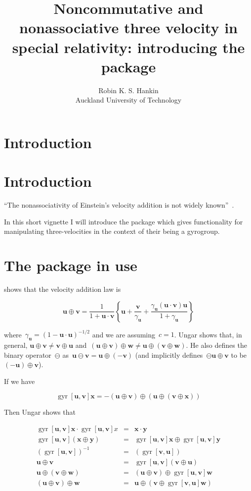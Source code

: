 \documentclass[nojss]{jss}
\author{Robin K. S. Hankin\\Auckland University of Technology}
\title{Noncommutative and nonassociative three velocity in special relativity: introducing the \pkg{gyrogroup} package}
\newcommand{\bu}{\mathbf u}
\newcommand{\bv}{\mathbf v}
\newcommand{\bw}{\mathbf w}
\newcommand{\bx}{\mathbf x}
\newcommand{\by}{\mathbf y}
\DeclareMathOperator{\gyr}{gyr}
\begin{document}
\section{Introduction}



\section{Introduction}

``The nonassociativity of Einstein's velocity addition is not widely
known''~\citep{ungar2006}.

In this short vignette I will introduce the  package which gives
functionality for manipulating three-velocities in the context of their being a gyrogroup.

\section{The package in use}

\cite{ungar2006} shows that the velocity addition law is

\begin{equation}
\bu\oplus\bv=
\frac{1}{1+\bu\cdot\bv}
\left\{
\bu + \frac{\bv}{\gamma_\bu} + \frac{\gamma_\bu
\left(\bu\cdot\bv\right)\bu}{1+\gamma_\bu}
\right\}
\end{equation}
   
where~$\gamma_\bu=\left(1-\bu\cdot\bu\right)^{-1/2}$ and we are
assuming~$c=1$.  Ungar shows that, in general,
$\bu\oplus\bv\neq\bv\oplus\bu$
and~$(\bu\oplus\bv)\oplus\bw\neq\bu\oplus(\bv\oplus\bw)$.  He also
defines the binary operator~$\ominus$
as~$\bu\ominus\bv=\bu\oplus\left(-\bv\right)$ (and implicitly
defines~$\ominus\bu\oplus\bv$ to be~$\left(-\bu\right)\oplus\bv$).

If we have

\begin{equation}
\gyr\left[\bu,\bv\right]\bx=-\left(\bu\oplus\bv\right)\oplus\left(\bu\oplus\left(\bv\oplus\bx\right)\right)
\end{equation}

Then Ungar shows that 

\begin{eqnarray}
\gyr\left[\bu,\bv\right]\bx\cdot\gyr\left[\bu,\bv\right]x &=& \bx\cdot\by\\
\gyr\left[\bu,\bv\right]\left(\bx\oplus\by\right) &=& \gyr\left[\bu,\bv\right]\bx\oplus\gyr\left[\bu,\bv\right]\by\\
\left(\gyr\left[\bu,\bv\right]\right)^{-1} &=& \left(\gyr\left[\bv,\bu\right]\right)\\
\bu\oplus\bv &=& \gyr\left[\bu,\bv\right]\left(\bv\oplus\bu\right)\\
\bu\oplus\left(\bv\oplus\bw\right) &=&\left(\bu\oplus\bv\right)\oplus\gyr\left[\bu,\bv\right]\bw\\
\left(\bu\oplus\bv\right)\oplus\bw &=&\bu\oplus\left(\bv\oplus\gyr\left[\bv,\bu\right]\bw\right)
\end{eqnarray}
\end{document}
